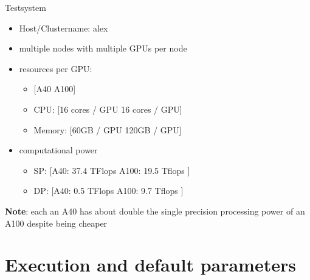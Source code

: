 \documentclass[ignorenonframetext,aspectratio=169]{beamer}
\providecommand{\tightlist}{%
  \setlength{\itemsep}{0pt}\setlength{\parskip}{0pt}}
\begin{document}
\begin{frame}{Testsystem}    
    \begin{itemize}
        \tightlist
        \item Host/Clustername: alex
        \item multiple nodes with multiple GPUs per node
        \item
          resources per GPU:
        
          \begin{itemize}
          \tightlist
          \item
            {[}A40 \textbar{} A100{]}
          \item
            CPU: {[}16 cores / GPU \textbar{} 16 cores / GPU{]}
          \item
            Memory: {[}60GB / GPU \textbar{} 120GB / GPU{]}
          \end{itemize}
        \item computational power
        \begin{itemize}
            \item SP: {[}A40: 37.4 TFlops \textbar{} A100: 19.5 Tflops {]}
            \item DP: {[}A40: 0.5 TFlops \textbar{} A100: 9.7 Tflops {]}
        \end{itemize}
    \end{itemize}
    
    \textbf{Note}: each an A40 has about double the single precision
    processing power of an A100 despite being cheaper
\end{frame}

\section{Execution and default parameters}
\end{document}
